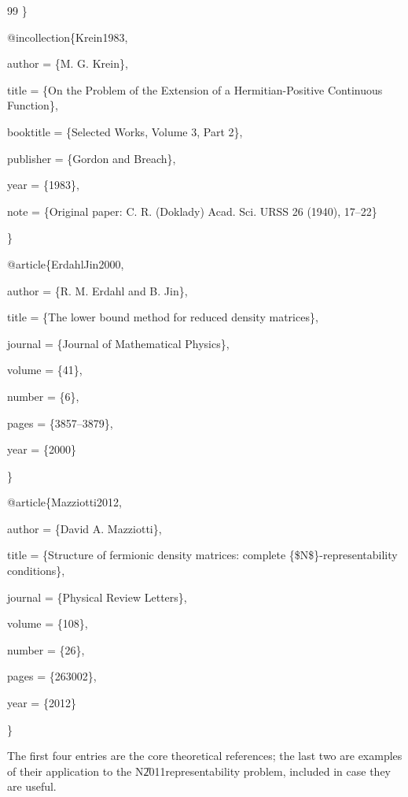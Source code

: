 \documentclass[aps,preprint]{revtex4}
\begin{document}
\begin{thebibliography}{99}
\bibitem{} \}

\bibitem{} @incollection\{Krein1983,

\bibitem{} author = \{M. G. Krein\},

\bibitem{} title = \{On the Problem of the Extension of a Hermitian-Positive
Continuous Function\},

\bibitem{} booktitle = \{Selected Works, Volume 3, Part 2\},

\bibitem{} publisher = \{Gordon and Breach\},

\bibitem{} year = \{1983\},

\bibitem{} note = \{Original paper: C. R. (Doklady) Acad. Sci. URSS 26
(1940), 17--22\}

\bibitem{} \}

\bibitem{} @article\{ErdahlJin2000,

\bibitem{} author = \{R. M. Erdahl and B. Jin\},

\bibitem{} title = \{The lower bound method for reduced density matrices\},

\bibitem{} journal = \{Journal of Mathematical Physics\},

\bibitem{} volume = \{41\},

\bibitem{} number = \{6\},

\bibitem{} pages = \{3857--3879\},

\bibitem{} year = \{2000\}

\bibitem{} \}

\bibitem{} @article\{Mazziotti2012,

\bibitem{} author = \{David A. Mazziotti\},

\bibitem{} title = \{Structure of fermionic density matrices: complete
\{\$N\$\}-representability conditions\},

\bibitem{} journal = \{Physical Review Letters\},

\bibitem{} volume = \{108\},

\bibitem{} number = \{26\},

\bibitem{} pages = \{263002\},

\bibitem{} year = \{2012\}

\bibitem{} \}

The first four entries are the core theoretical references; the last two are
examples of their application to the N\U{2011}representability problem,
included in case they are useful.
\end{thebibliography}
\end{document}
